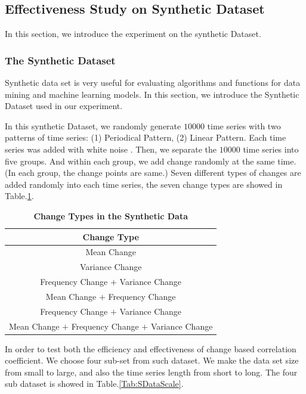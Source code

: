\subsection{Effectiveness Study on Synthetic Dataset}

In this section, we introduce the experiment on the synthetic Dataset.

\subsubsection{The Synthetic Dataset}

Synthetic data set is very useful for evaluating algorithms and functions for data mining and machine learning models\cite{han2011data}. 
In this section, we introduce the Synthetic Dataset used in our experiment.

In this synthetic Dataset, we randomly generate $10000$ time series with two patterns of time series: (1) Periodical Pattern, (2) Linear Pattern.
Each time series was added with white noise \cite{han2011data}. 
Then, we separate the $10000$ time series into five groups. And within each group, we add change randomly at the same time. (In each group, the change points are same.)
Seven different types of changes are added randomly into each time series, the seven change types are showed in Table.\ref{Tab:ChangeType}.

\begin{table}[t]
\caption{\textbf{Change Types in the Synthetic Data}}
\centering

\begin{tabular}{|c|}
\hline Change Type \\
\hline Mean Change \\
\hline Variance Change\\
\hline Frequency Change $+$ Variance Change\\
\hline Mean Change $+$ Frequency Change \\
\hline Frequency Change $+$ Variance Change\\
\hline Mean Change $+$ Frequency Change $+$ Variance Change\\
\hline
\end{tabular}
\label{Tab:ChangeType}
\end{table}

In order to test both the efficiency and effectiveness of change based correlation coefficient. We choose four sub-set from such dataset. 
We make the data set size from small to large, and also the time series length from short to long. The four sub dataset is showed in Table.\ref{Tab:SDataScale}. 

